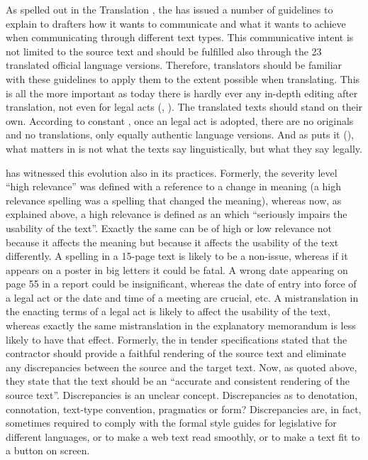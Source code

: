 \documentclass[output=paper]{langsci/langscibook}
\begin{document}
As spelled out in the  Translation , the  has issued a number of  guidelines to explain to drafters how it wants to communicate and what it wants to achieve when communicating through different text types. This communicative intent is not limited to the source text and should be fulfilled also through the 23 translated official language versions. Therefore, translators should be familiar with these guidelines to apply them to the extent possible when translating. This is all the more important as today there is hardly ever any in-depth editing after translation, not even for legal acts (\citealt[62]{Guggeis2012}, \citealt{Strandvik2014}). The translated texts should stand on their own. According to constant , once an  legal act is adopted, there are no originals and no translations, only equally authentic language versions. And as \citeauthor{Husa2012} puts it (\citeyear[179]{Husa2012}), what matters in  is not what the texts say linguistically, but what they say legally. 

 has witnessed this evolution also in its  practices. Formerly, the severity level ``high relevance'' was defined with  a reference to a change in meaning (a high relevance spelling  was a spelling  that changed the meaning), whereas now, as explained above, a high relevance  is defined as an  which ``seriously impairs the usability of the text''. Exactly the same  can be of high or low relevance not because it affects the meaning but because it affects the usability of the text differently. A spelling  in a 15-page text is likely to be a non-issue, whereas if it appears on a poster in big letters it could be fatal. A wrong date appearing on page 55 in a report could be insignificant, whereas the date of entry into force of a legal act or the date and time of a meeting are crucial, etc. A mistranslation in the enacting terms of a legal act is likely to affect the usability of the text, whereas exactly the same mistranslation in the explanatory memorandum is less likely to have that effect. Formerly, the  in tender specifications stated that the contractor should provide a faithful rendering of the source text and eliminate any discrepancies between the source and the target text. Now, as quoted above, they state that the text should be an ``accurate and consistent rendering of the source text''. Discrepancies is an unclear concept. Discrepancies as to denotation, connotation, text-type convention, pragmatics or form? Discrepancies are, in fact, sometimes required to comply with the formal style guides for legislative  for different languages, or to make a web text read smoothly, or to make a text fit to a button on screen.
\end{document}
